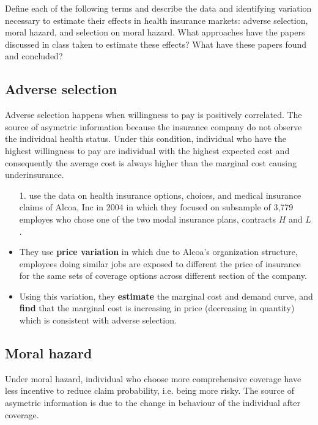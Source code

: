 \documentclass{article}
\begin{document}
Define each of the following terms and describe the data and identifying variation necessary to estimate their effects in health insurance markets: adverse selection, moral hazard, and selection on moral hazard. What approaches have the papers discussed in class taken to estimate these effects? What have these papers found and concluded?

\subsection*{Adverse selection}
Adverse selection happens when willingness to pay is positively correlated. The source of asymetric information because the insurance company do not observe the individual health status. Under this condition, individual who have the highest willingness to pay are individual with the highest expected cost and consequently the average cost is always higher than the marginal cost causing underinsurance. 

\begin{itemize}
    \item[1.] \textbf{\cite{einav2010estimating}} use the data on health insurance options, choices, and medical insurance claims of Alcoa, Inc in 2004 in which they focused on subsample of 3,779 employes who chose one of the two modal insurance plans, contracts $H$ and $L$. 
    \item They use \textbf{price variation} in which due to Alcoa's organization structure, employees doing similar jobs are exposed to different the price of insurance for the same sets of coverage options across different section of the company. 
    \item Using this variation, they \textbf{estimate} the marginal cost and demand curve, and \textbf{find} that the marginal cost is increasing in price (decreasing in quantity) which is consistent with adverse selection.
\end{itemize}

\subsection*{Moral hazard}
Under moral hazard, individual who choose more comprehensive coverage have less incentive to reduce claim probability, i.e. being more risky. The source of asymetric information is due to the change in behaviour of the individual after coverage. 
\end{document}
